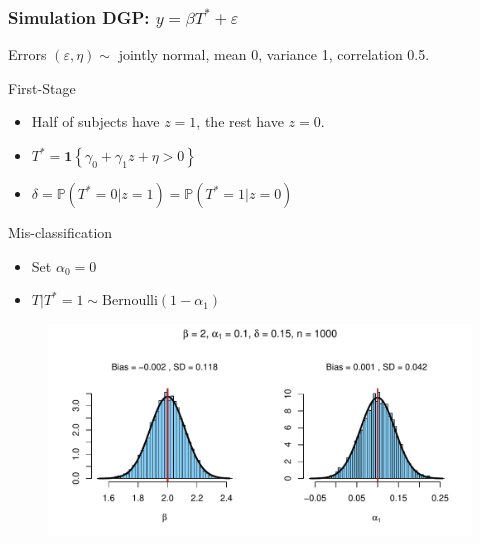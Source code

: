 \documentclass{beamer}
\begin{document}
\begin{frame}
  \frametitle{Simulation DGP: $y = \beta T^* + \varepsilon$}
  \begin{block}{Errors}
      $(\varepsilon, \eta) \sim $ jointly normal, mean 0, variance 1, correlation 0.5.
  \end{block}
  \begin{block}{First-Stage}
      \begin{itemize}
        \item Half of subjects have $z=1$, the rest have $z=0$.
        \item $T^* = \mathbf{1}\left\{ \gamma_0 + \gamma_1 z + \eta > 0 \right\}$
        \item $\delta = \mathbb{P}(T^* = 0|z =1) = \mathbb{P}(T^*=1|z=0)$
      \end{itemize}
  \end{block}
  \vspace{-1em}


  \begin{block}{Mis-classification}
      \begin{itemize}
        \item Set $\alpha_0 = 0$ 
        \item $T|T^*=1 \sim \mbox{Bernoulli}(1-\alpha_1)$
      \end{itemize}
  \end{block}
  
\end{frame}
%
%
\begin{frame}[plain,c]

  \begin{figure}[h]
    \centering
    \includegraphics[width=\textwidth]{Rplot2}
  \end{figure}

\end{frame}
\end{document}
